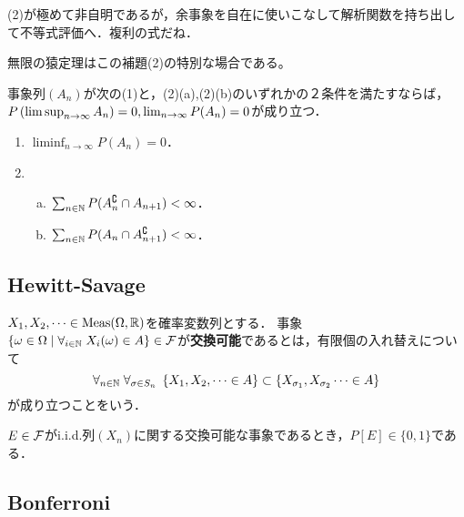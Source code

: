 \documentclass[uplatex,dvipdfmx]{jsreport}
\begin{document}
\begin{remarks}[どうやら洗練された証明はこの一通りである]
    (2)が極めて非自明であるが，余事象を自在に使いこなして解析関数を持ち出して不等式評価へ．複利の式だね．
\end{remarks}
\begin{example}
    無限の猿定理はこの補題(2)の特別な場合である。
\end{example}

\begin{corollary}
    事象列$(A_n)$が次の(1)と，(2)(a),(2)(b)のいずれかの２条件を満たすならば，$P\left(\limsup_{n\to\infty}A_n\right)=0,\lim_{n\to\infty}P(A_n)=0$が成り立つ．
    \begin{enumerate}
        \item $\liminf_{n\to\infty}P(A_n)=0$．
        \item \begin{enumerate}[(a)]
            \item $\sum_{n\in\mathbb{N}}P(A^\complement_n\cap A_{n+1})<\infty$．
            \item $\sum_{n\in\mathbb{N}}P(A_n\cap A^\complement_{n+1})<\infty$．
        \end{enumerate}
    \end{enumerate}
\end{corollary}

\subsection{Hewitt-Savage}

\begin{definition}
    $X_1,X_2,\cdots\in\mathrm{Meas}(\Omega,\mathbb{R})$を確率変数列とする．
    事象$\{\omega\in\Omega\mid\forall_{i\in\mathbb{N}}\;X_i(\omega)\in A\}\in\mathcal{F}$が\textbf{交換可能}であるとは，有限個の入れ替えについて
    \[\forall_{n\in\mathbb{N}}\;\forall_{\sigma\in S_n}\;\left\{X_1,X_2,\cdots\in A\right\}\subset\left\{X_{\sigma_1},X_{\sigma_2}\cdots\in A\right\}\]
    が成り立つことをいう．
\end{definition}

\begin{lemma}
    $E\in\mathcal{F}$がi.i.d.列$(X_n)$に関する交換可能な事象であるとき，$P[E]\in\{0,1\}$である．
\end{lemma}

\subsection{Bonferroni}

\begin{tcolorbox}[colframe=ForestGreen, colback=ForestGreen!10!white,breakable,colbacktitle=ForestGreen!40!white,coltitle=black,fonttitle=\bfseries\sffamily,
title=有界測度論としては初等的でも，確率論的には非自明で名前がほしい結果は多い]
    
\end{tcolorbox}
\end{document}
